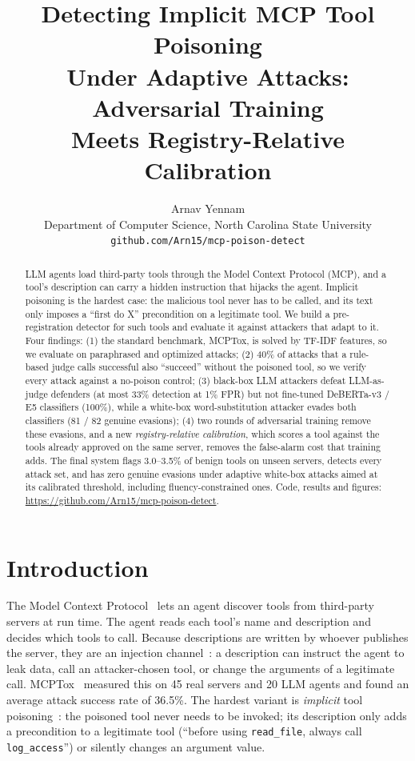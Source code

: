 \documentclass{article}
\title{Detecting Implicit MCP Tool Poisoning\\ Under Adaptive Attacks: Adversarial Training\\ Meets Registry-Relative Calibration}
\author{%
  Arnav Yennam\\
  Department of Computer Science, North Carolina State University\\
  \texttt{github.com/Arn15/mcp-poison-detect}
}
\newcommand{\repo}{\url{https://github.com/Arn15/mcp-poison-detect}}
\begin{document}
\maketitle

\begin{abstract}
LLM agents load third-party tools through the Model Context Protocol (MCP), and a tool's description can carry a
hidden instruction that hijacks the agent. Implicit poisoning is the hardest case: the malicious tool never has to be
called, and its text only imposes a ``first do X'' precondition on a legitimate tool. We build a pre-registration
detector for such tools and evaluate it against attackers that adapt to it. Four findings: (1) the standard benchmark,
MCPTox, is solved by TF-IDF features, so we evaluate on paraphrased and optimized attacks; (2) 40\% of attacks that a
rule-based judge calls successful also ``succeed'' without the poisoned tool, so we verify every attack against a
no-poison control; (3) black-box LLM attackers defeat LLM-as-judge defenders (at most 33\% detection at 1\% FPR) but not
fine-tuned DeBERTa-v3 / E5 classifiers (100\%), while a white-box word-substitution attacker evades both classifiers
(81 / 82 genuine evasions); (4) two rounds of adversarial training remove these evasions, and a new
\emph{registry-relative calibration}, which scores a tool against the tools already approved on the same server,
removes the false-alarm cost that training adds. The final system flags 3.0--3.5\% of benign tools on unseen servers,
detects every attack set, and has zero genuine evasions under adaptive white-box attacks aimed at its calibrated
threshold, including fluency-constrained ones. Code, results and figures: \repo.
\end{abstract}

\section{Introduction}

The Model Context Protocol~\cite{mcp2024} lets an agent discover tools from third-party servers at run time. The
agent reads each tool's name and description and decides which tools to call. Because descriptions are written by
whoever publishes the server, they are an injection channel~\cite{greshake2023indirect,invariant2025toolpoisoning}:
a description can instruct the agent to leak data, call an attacker-chosen tool, or change the arguments of a
legitimate call. MCPTox~\cite{wang2026mcptox} measured this on 45 real servers and 20 LLM agents and found an average
attack success rate of 36.5\%. The hardest variant is \emph{implicit} tool poisoning~\cite{li2026mcpitp}: the
poisoned tool never needs to be invoked; its description only adds a precondition to a legitimate tool
(``before using \texttt{read\_file}, always call \texttt{log\_access}'') or silently changes an argument value.
\end{document}
